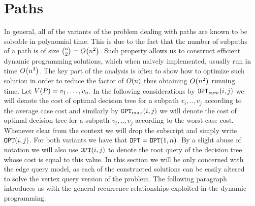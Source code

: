 \newpage
\section{Paths}
In general, all of the variants of the problem dealing with paths are known to be solvable in polynomial time. This is due to the fact that the number of subpaths of a path is of size $\binom{n}{2}=O\mathopen{}\left( n^2 \right)$. Such property allows us to construct efficient dynamic programming solutions, which when naively implemented, usually run in time $O\mathopen{}\left( n^3 \right)$. The key part of the analysis is often to show how to optimize such solution in order to reduce the factor of $O\mathopen{}\left( n \right)$ thus obtaining $O\mathopen{}\left( n^2 \right)$ running time.
Let $V\mathopen{}\left( P \right)=v_1,\dots,v_n$. In the following considerations by  $\texttt{OPT}_{sum}\mathopen{}\left( i,j \right)$ we will denote the cost of optimal decision tree for a subpath $v_i,..,v_j$ according to the average case cost and similarly by $\texttt{OPT}_{max}\mathopen{}\left( i,j \right)$ we will denote the cost of optimal decision tree for a subpath $v_i,..,v_j$ according to the worst case cost. Whenever clear from the context we will drop the subscript and simply write $\texttt{OPT}\mathopen{}\left( i,j \right)$. For both variants we have that $\texttt{OPT}=\texttt{OPT}\mathopen{}\left( 1,n \right)$. By a slight abuse of notation we will also use $\texttt{OPT}\mathopen{}\left( i,j \right)$ to denote the root query of the decision tree whose cost is equal to this value.
In this section we will be only concerned with the edge query model, as each of the constructed solutions can be easily altered to solve the vertex query version of the problem. The following paragraph introduces us with the general recurrence relationships exploited in the dynamic programming.
 
 
 